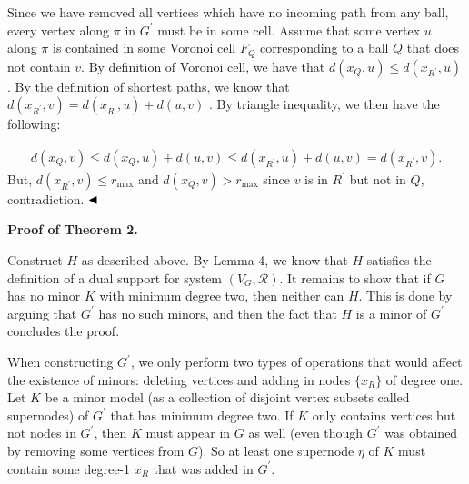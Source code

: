 \par
\par
Since we have removed all vertices which have no incoming path from any ball, every vertex along $\pi$ in $G^{\prime}$ must be in some cell. Assume that some vertex $u$ along $\pi$ is contained in some Voronoi cell $F_{Q}$ corresponding to a ball $Q$ that does not contain $v$. By definition of Voronoi cell, we have that $d(x_{Q},u)\leq d(x_{R^{\prime}},u)$. By the definition of shortest paths, we know that $d(x_{R^{\prime}},v)=d(x_{R^{\prime}},u)+d(u,v)$ . By triangle inequality, we then have the following:
\par
\[\begin{aligned}
d(x_{Q},v)\leq d(x_{Q},u)+d(u,v)\leq d(x_{R^{\prime}},u)+d(u,v)=d(x_{R^{\prime%
}},v).
\end{aligned}\]
But, $d(x_{R^{\prime}},v)\leq r_{\max}$ and $d(x_{Q},v)>r_{\max}$ since $v$ is in $R^{\prime}$ but not in $Q$, contradiction. $\hfill\blacktriangleleft$
\par
\par
\par\medskip\noindent\textbf{Proof of Theorem 2.}\par
Construct $H$ as described above. By Lemma 4, we know that $H$ satisfies the definition of a dual support for system $(V_{G},\mathcal{R})$. It remains to show that if $G$ has no minor $K$ with minimum degree two, then neither can $H$. This is done by arguing that $G^{\prime}$ has no such minors, and then the fact that $H$ is a minor of $G^{\prime}$ concludes the proof.
\par
\par
When constructing $G^{\prime}$, we only perform two types of operations that would affect the existence of minors: deleting vertices and adding in nodes $\{x_{R}\}$ of degree one. Let $K$ be a minor model (as a collection of disjoint vertex subsets called supernodes) of $G^{\prime}$ that has minimum degree two. If $K$ only contains vertices but not nodes in $G^{\prime}$, then $K$ must appear in $G$ as well (even though $G^{\prime}$ was obtained by removing some vertices from $G$). So at least one supernode $\eta$ of $K$ must contain some degree-1 $x_{R}$ that was added in $G^{\prime}$.
\par
\par

